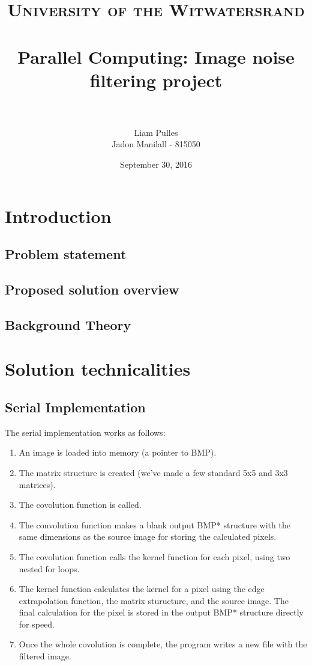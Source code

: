 \documentclass[paper=a4, fontsize=11pt]{scrartcl} %
\title{	
\normalfont \normalsize 
\textsc{University of the Witwatersrand} \\ [25pt] %
\horrule{0.5pt} \\[0.4cm] %
\huge Parallel Computing: Image noise filtering project \\ %
\horrule{2pt} \\[0.5cm] %
}
\author{Liam Pulles\\
		Jadon Manilall - 815050} %
\date{\normalsize September 30, 2016} %
\numberwithin{equation}{section} %
\numberwithin{figure}{section} %
\numberwithin{table}{section} %
\begin{document}
\maketitle %

\section{Introduction}
\subsection{Problem statement}
\subsection{Proposed solution overview}
\subsection{Background Theory}

\section{Solution technicalities}
\subsection{Serial Implementation}
The serial implementation works as follows:
\begin{enumerate}
\item An image is loaded into memory (a pointer to BMP).
\item The matrix structure is created (we've made a few standard 5x5 and 3x3 matrices).
\item The covolution function is called.
\item The convolution function makes a blank output BMP* structure with the same dimensions as the source image for storing the calculated pixels. 
\item The covolution function calls the kernel function for each pixel, using two nested for loops.
\item The kernel function calculates the kernel for a pixel using the edge extrapolation function, the matrix sturucture, and the source image. The final calculation for the pixel is stored in the output BMP* structure directly for speed.
\item Once the whole covolution is complete, the program writes a new file with the filtered image.
\end{enumerate}
  
\end{document}
